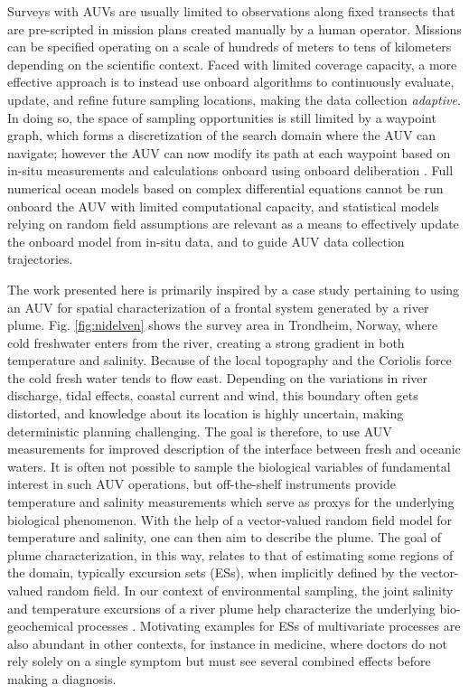 \documentclass[aoas]{imsart}
\begin{document}
Surveys with AUVs are usually limited to observations along fixed
transects that are pre-scripted in mission plans created manually by a
human operator. Missions can be specified operating on a scale of
hundreds of meters to tens of kilometers depending on the scientific
context. Faced with limited coverage capacity, a more effective
approach is to instead use onboard algorithms to continuously
evaluate, update, and refine future sampling locations, making the
data collection \emph{adaptive}.  In doing so, the space of sampling
opportunities is still limited by a waypoint graph, which forms a
discretization of the search domain where the AUV can navigate;
however the AUV can now modify its path at each waypoint based on
in-situ measurements and calculations onboard using onboard
deliberation \citep{py10,Rajan12,Rajan12b}.  Full numerical ocean
models based on complex differential equations cannot be run onboard
the AUV with limited computational capacity, and statistical models
relying on random field assumptions are relevant as a means to
effectively update the onboard model from in-situ data, and to guide
AUV data collection trajectories.

The work presented here is primarily inspired by a case study
pertaining to using an AUV for spatial characterization of a frontal
system generated by a river plume. Fig. \ref{fig:nidelven} shows the
survey area in Trondheim, Norway, where cold freshwater enters from
the river, creating a strong gradient in both temperature and
salinity. Because of the local topography and the Coriolis force the
cold fresh water tends to flow east. Depending on the variations in
river discharge, tidal effects, coastal current and wind, this
boundary often gets distorted, and knowledge about its location is
highly uncertain, making deterministic planning challenging. The goal
is therefore, to use AUV measurements for improved description of the
interface between fresh and oceanic waters.  It is often not possible
to sample the biological variables of fundamental interest in such AUV
operations, but off-the-shelf instruments provide temperature and
salinity measurements which serve as proxys for the underlying
biological phenomenon. With the help of a vector-valued random field
model for temperature and salinity, one can then aim to describe the
plume.  The goal of plume characterization, in this way, relates to
that of estimating some regions of the domain, typically excursion
sets (ESs), when implicitly defined by the vector-valued random field.
In our context of environmental sampling, the joint salinity and
temperature excursions of a river plume help characterize the
underlying bio-geochemical processes
\citep{hopkins2013detection,Pinto2018}. Motivating examples for ESs of
multivariate processes are also abundant in other contexts, for
instance in medicine, where doctors do not rely solely on a single
symptom but must see several combined effects before making a
diagnosis.
\end{document}
